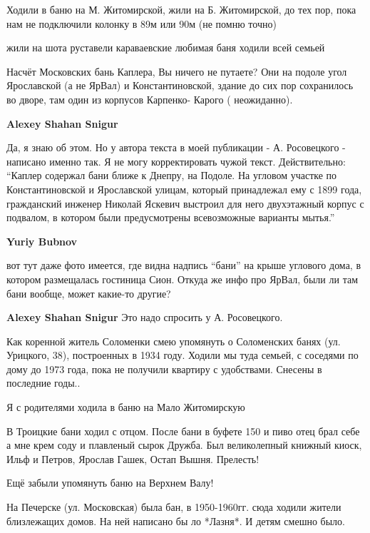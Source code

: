 \begin{itemize}

Ходили в баню на М. Житомирской, жили на Б. Житомирской, до тех пор, пока нам
не подключили колонку в 89м или 90м (не помню точно)


жили на шота руставели караваевские любимая баня ходили всей семьей


Насчёт Московских бань Каплера, Вы ничего не путаете? Они на подоле угол
Ярославской (а не ЯрВал) и Константиновской, здание до сих пор сохранилось во
дворе, там один из корпусов Карпенко- Карого ( неожиданно).

\begin{itemize} %
\textbf{Alexey Shahan Snigur} 

Да, я знаю об этом. Но у автора текста в моей публикации - А. Росовецкого -
написано именно так. Я не могу корректировать чужой текст. Действительно:
\enquote{Каплер содержал бани ближе к Днепру, на Подоле. На угловом участке по
Константиновской и Ярославской улицам, который принадлежал ему с 1899 года,
гражданский инженер Николай Яскевич выстроил для него двухэтажный корпус с
подвалом, в котором были предусмотрены всевозможные варианты мытья.}

\textbf{Yuriy Bubnov} 

вот тут даже фото имеется, где видна надпись \enquote{бани} на крыше углового дома, в
котором размещалась гостиница Сион. Откуда же инфо про ЯрВал, были ли там бани
вообще, может какие-то другие?

\textbf{Alexey Shahan Snigur} Это надо спросить у А. Росовецкого.

\end{itemize} %


Как коренной житель Соломенки смею упомянуть о Соломенских банях
(ул. Урицкого, 38), построенных в 1934 году. Ходили мы туда семьей, с соседями по
дому до 1973 года, пока не получили квартиру с удобствами. Снесены в последние
годы..

Я с родителями ходила в баню на Мало Житомирскую


В Троицкие бани ходил с отцом. После бани в буфете 150 и пиво отец брал себе а
мне крем соду и плавленый сырок Дружба. Был великолепный книжный киоск, Ильф и
Петров, Ярослав Гашек, Остап Вышня. Прелесть!

Ещё забыли упомянуть баню на Верхнем Валу!


На Печерске (ул. Московская) была бан, в 1950-1960гг. сюда ходили жители
близлежащих домов. На ней написано бы ло *Лазня*. И детям смешно было.


\end{itemize} %
